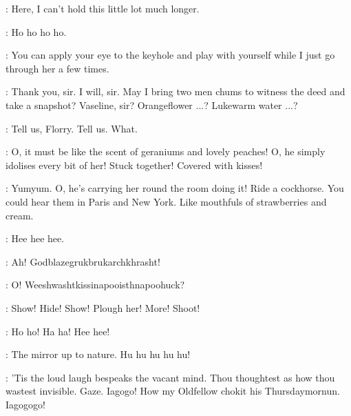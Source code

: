 \Boylan:
Here, I can't hold this little lot much longer.

\Bella:
Ho ho ho ho.

\Boylan:
You can apply your eye to the keyhole
and play with yourself while I just go through her a few times.

\Bloom:
Thank you, sir.
I will, sir.
May I bring two men chums to witness the deed and take a snapshot?
Vaseline, sir?
Orangeflower ...?
Lukewarm water ...?

\Kitty:
Tell us, Florry.
Tell us.
What.


\MinaKennedy:
O, it must be like the scent of geraniums and lovely peaches!
O, he simply idolises every bit of her!
Stuck together!
Covered with kisses!

\LydiaDouce:
Yumyum.
O, he's carrying her round the room doing it!
Ride a cockhorse.
You could hear them in Paris and New York.
Like mouthfuls of strawberries and cream.

\Kitty:
Hee hee hee.

\BoylansVoice:
Ah!
Godblazegrukbrukarchkhrasht!%

\MarionsVoice:
O!
Weeshwashtkissinapooisthnapoohuck?

\Bloom:
Show! Hide! Show!
Plough her!
More!
Shoot!

\BellaZoeFlorryKitty:
Ho ho!
Ha ha!
Hee hee!

\Lynch:
The mirror up to nature.
Hu hu hu hu hu!


\Shakespeare:
'Tis the loud laugh bespeaks the vacant mind.
Thou thoughtest as how thou wastest invisible.
Gaze.
Iagogo!
How my Oldfellow chokit his Thursdaymornun.
Iagogogo!

